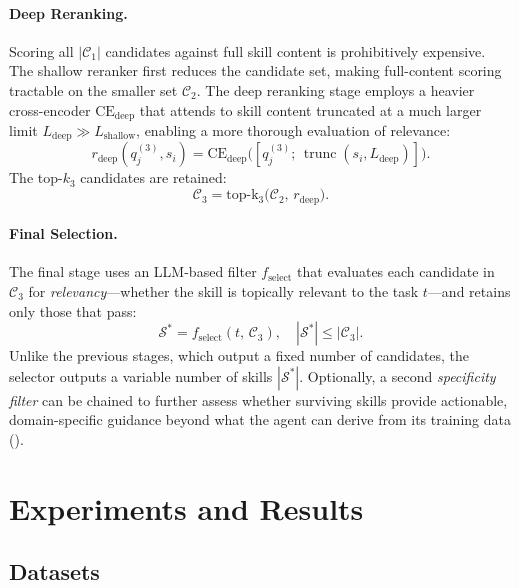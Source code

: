 \documentclass[11pt]{article}
\begin{document}
\paragraph{Deep Reranking.}
Scoring all $|\mathcal{C}_1|$ candidates against full skill content is prohibitively expensive. The shallow reranker first reduces the candidate set, making full-content scoring tractable on the smaller set $\mathcal{C}_2$.
The deep reranking stage employs a heavier cross-encoder $\text{CE}_{\text{deep}}$ that attends to skill content truncated at a much larger limit $L_{\text{deep}} \gg L_{\text{shallow}}$, enabling a more thorough evaluation of relevance:
\begin{equation}
  r_{\text{deep}}(q^{(3)}_j, s_i) = \text{CE}_{\text{deep}}\!\bigl([q^{(3)}_j;\, \operatorname{trunc}(s_i, L_{\text{deep}})]\bigr).
\end{equation}
The top-$k_3$ candidates are retained:
\begin{equation}
  \mathcal{C}_3 = \operatorname{top\text{-}k_3}\!\bigl(\mathcal{C}_2,\, r_{\text{deep}}\bigr).
\end{equation}

\paragraph{Final Selection.}
The final stage uses an LLM-based filter $f_{\text{select}}$ that evaluates each candidate in $\mathcal{C}_3$ for \emph{relevancy}---whether the skill is topically relevant to the task $t$---and retains only those that pass:
\begin{equation}
  \mathcal{S}^* = f_{\text{select}}(t,\, \mathcal{C}_3), \quad |\mathcal{S}^*| \leq |\mathcal{C}_3|.
\end{equation}
Unlike the previous stages, which output a fixed number of candidates, the selector outputs a variable number of skills $|\mathcal{S}^*|$.
Optionally, a second \emph{specificity filter} can be chained to further assess whether surviving skills provide actionable, domain-specific guidance beyond what the agent can derive from its training data ().

\section{Experiments and Results}

\subsection{Datasets}
\end{document}
